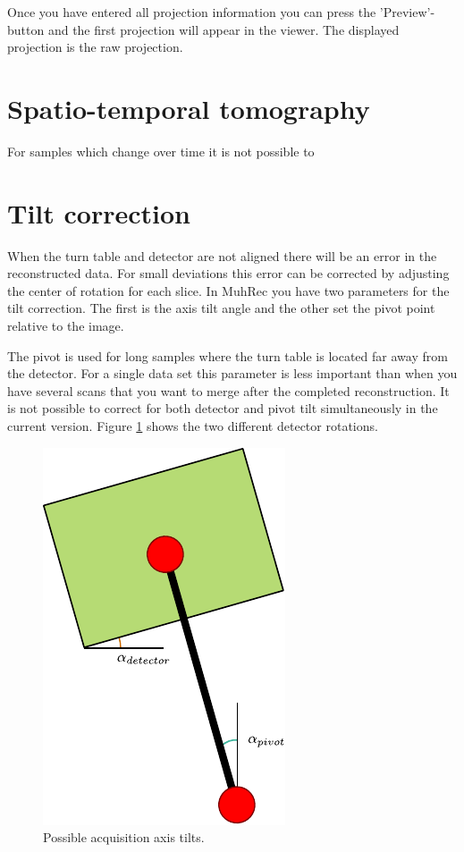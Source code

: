 \documentclass[a4paper]{scrreprt}
\begin{document}
Once you have entered all projection information you can press the
'Preview'-button and the first projection will appear in the viewer. The
displayed projection is the raw projection.

\section{Spatio-temporal tomography}
For samples which change over time it is not possible to 


\section{Tilt correction}
When the turn table and detector are not aligned there will be an error in the
reconstructed data. For small deviations this error can be corrected by
adjusting the center of rotation for each slice. In MuhRec you have two
parameters for the tilt correction. The first is the axis tilt angle and the
other set the pivot point relative to the image.


The pivot is used for long samples where the turn table is located far away from
the detector. For a single data set this parameter is less important than when
you have several scans that you want to merge after the completed
reconstruction. It is not possible to correct for both detector and pivot tilt
simultaneously in the current version. Figure \ref{fig_axistilt} shows the two
different detector rotations.

\begin{figure}[ht!]
\centering
\includegraphics{figures/axis_tilt.pdf}
\caption{Possible acquisition axis tilts.}\label{fig_axistilt}
\end{figure}
\end{document}
